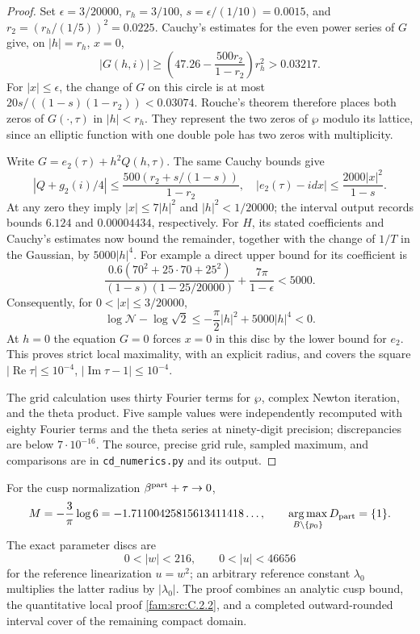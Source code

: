 \begin{proof}
Set $\epsilon=3/20000$, $r_h=3/100$, $s=\epsilon/(1/10)=0.0015$,
and $r_2=(r_h/(1/5))^2=0.0225$.
Cauchy's estimates for the even power series of $G$ give, on
$|h|=r_h$, $x=0$,
\[
 |G(h,i)|\geq
 \left(47.26-\frac{500r_2}{1-r_2}\right)r_h^2>0.03217.
\]
For $|x|\leq\epsilon$, the change of $G$ on this circle is at most
$20s/((1-s)(1-r_2))<0.03074$. Rouche's theorem therefore places both
zeros of $G(\cdot,\tau)$ in $|h|<r_h$. They represent the two zeros of
$\wp$ modulo its lattice, since an elliptic function with one double
pole has two zeros with multiplicity.

Write $G=e_2(\tau)+h^2Q(h,\tau)$. The same Cauchy bounds give
\[
 |Q+g_2(i)/4|\leq
 \frac{500(r_2+s/(1-s))}{1-r_2},
\quad
 |e_2(\tau)-idx|\leq
 \frac{2000|x|^2}{1-s}.
\]
At any zero they imply $|x|\leq7|h|^2$ and $|h|^2<1/20000$;
the interval output records bounds $6.124$ and $0.00004434$,
respectively. For $H$, its stated coefficients and Cauchy's estimates
now bound the remainder, together with the change of $1/T$ in the
Gaussian, by $5000|h|^4$. For example a direct upper bound for its
coefficient is
\[
 \frac{0.6(70^2+25\cdot70+25^2)}
 {(1-s)(1-25/20000)}+\frac{7\pi}{1-\epsilon}<5000.
\]
Consequently, for $0<|x|\leq3/20000$,
\[
 \log\mathcal N-\log\sqrt2
 \leq-\frac\pi2|h|^2+5000|h|^4<0.
\]
At $h=0$ the equation $G=0$ forces $x=0$ in this disc by the lower
bound for $e_2$. This proves strict local maximality, with an explicit
radius, and covers the square
$|\operatorname{Re}\tau|\leq10^{-4}$,
$|\operatorname{Im}\tau-1|\leq10^{-4}$.

The grid calculation uses thirty Fourier terms for $\wp$, complex
Newton iteration, and the theta product. Five sample values were
independently recomputed with eighty Fourier terms and the theta series
at ninety-digit precision; discrepancies are below $7\cdot10^{-16}$.
The source, precise grid rule, sampled maximum, and comparisons are in
\texttt{cd\_numerics.py} and its output.
\end{proof}

\begin{theorem}\label{fam:src:C.2.3}\label{fam:st:C.2.3}\label{ari:C.8.5}\label{push:src:E.4.3}
For the cusp normalization $\beta^{\rm part}+\tau\to0$,
\[
 M=-\frac3\pi\log6=-1.71100425815613411418\ldots,
 \qquad \operatorname*{arg\,max}_{B\setminus\{p_0\}}D_{\rm part}=\{1\}.
\]
The exact parameter discs are
\[
 0<|w|<216,
 \qquad 0<|u|<46656
\]
for the reference linearization $u=w^2$; an arbitrary reference constant
$\lambda_0$ multiplies the latter radius by $|\lambda_0|$.
The proof combines an analytic cusp bound, the quantitative local proof
\ref{fam:src:C.2.2}, and a completed outward-rounded interval cover of the remaining
compact domain.
\end{theorem}

